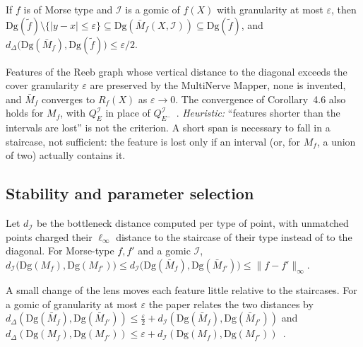 \begin{theorem}
\label{thm:convergence}
If $f$ is of Morse type and $\mathcal{I}$ is a gomic of $f(X)$ with
granularity at most $\varepsilon$, then
$\mathrm{Dg}(\tilde f)\setminus\{|y-x|\le\varepsilon\}
\subseteq\mathrm{Dg}(\bar M_f(X,\mathcal{I}))\subseteq\mathrm{Dg}(\tilde f)$,
and $d_\Delta\bigl(\mathrm{Dg}(\bar M_f),\mathrm{Dg}(\tilde f)\bigr)\le\varepsilon/2$.
\end{theorem}

Features of the Reeb graph whose vertical distance to the diagonal
exceeds the cover granularity $\varepsilon$ are preserved by the
MultiNerve Mapper, none is invented, and $\bar M_f$ converges to $R_f(X)$
as $\varepsilon\to0$. The convergence of Corollary~4.6 also holds for
$M_f$, with $Q^{\mathcal I}_E$ in place of
$Q^{\mathcal I}_{E^-}$~\cite[Sec.~4.3, Cor.~4.6]{carriere2018structure}. \emph{Heuristic:} ``features shorter than the intervals are
lost'' is not the criterion. A short span is necessary to fall in a
staircase, not sufficient: the feature is lost only if an interval (or,
for $M_f$, a union of two) actually contains it.

\subsection{Stability and parameter selection}

\begin{theorem}
Let $d_{\mathcal{I}}$ be the bottleneck distance computed per type of
point, with unmatched points charged their $\ell_\infty$ distance to the
staircase of their type instead of to the diagonal. For Morse-type
$f,f'$ and a gomic $\mathcal{I}$,
$d_{\mathcal{I}}\bigl(\mathrm{Dg}(M_f),\mathrm{Dg}(M_{f'})\bigr)
\le d_{\mathcal{I}}\bigl(\mathrm{Dg}(\bar M_f),\mathrm{Dg}(\bar M_{f'})\bigr)
\le\|f-f'\|_\infty$.
\end{theorem}

A small change of the lens moves each feature little relative to the
staircases. For a gomic of granularity at most $\varepsilon$ the paper
relates the two distances by
$d_\Delta(\mathrm{Dg}(\bar M_f),\mathrm{Dg}(\bar M_{f'}))\le\frac{\varepsilon}{2}+d_{\mathcal I}(\mathrm{Dg}(\bar M_f),\mathrm{Dg}(\bar M_{f'}))$
and
$d_\Delta(\mathrm{Dg}(M_f),\mathrm{Dg}(M_{f'}))\le\varepsilon+d_{\mathcal I}(\mathrm{Dg}(M_f),\mathrm{Dg}(M_{f'}))$~\cite[Thm.~5.2, Eqs.~(9)--(10)]{carriere2018structure}.


